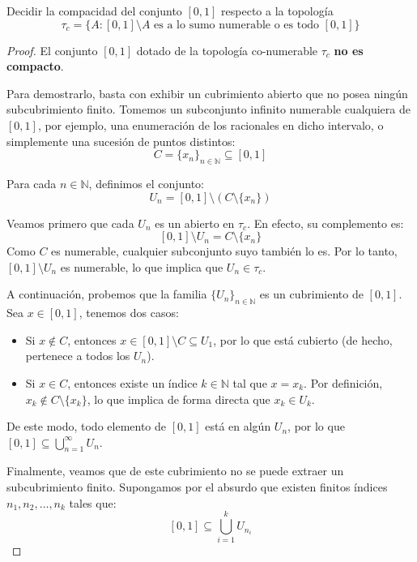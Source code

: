 \documentclass{article}
\theoremstyle{plain}
\theoremstyle{definition}
\newenvironment{ejercicio}[1]{\begin{trivlist}
\item[\hskip \labelsep {\bfseries Ejercicio}\hskip \labelsep {\bfseries #1.}]}{\end{trivlist}}
\begin{document}
\begin{ejercicio}{10}
    Decidir la compacidad del conjunto \( [0, 1] \) respecto a la topología
    \[ \tau_c = \{ A : [0,1] \setminus A \text{ es a lo sumo numerable o es todo } [0, 1] \} \]
\end{ejercicio}
\begin{proof}
    El conjunto \( [0, 1] \) dotado de la topología co-numerable \( \tau_c \) \textbf{no es compacto}.

    Para demostrarlo, basta con exhibir un cubrimiento abierto que no posea ningún subcubrimiento finito. Tomemos un subconjunto infinito numerable cualquiera de \( [0, 1] \), por ejemplo, una enumeración de los racionales en dicho intervalo, o simplemente una sucesión de puntos distintos:\[
        C = \{ x_n \}_{n \in \mathbb{N}} \subseteq [0, 1]
    \]

    Para cada \( n \in \mathbb{N} \), definimos el conjunto:\[
        U_n = [0, 1] \setminus (C \setminus \{ x_n \})
    \]

    Veamos primero que cada \( U_n \) es un abierto en \( \tau_c \). En efecto, su complemento es:\[
        [0, 1] \setminus U_n = C \setminus \{ x_n \}
    \]
    Como \( C \) es numerable, cualquier subconjunto suyo también lo es. Por lo tanto, \( [0, 1] \setminus U_n \) es numerable, lo que implica que \( U_n \in \tau_c \).

    A continuación, probemos que la familia \( {\{ U_n \}}_{n \in \mathbb{N}} \) es un cubrimiento de \( [0, 1] \). Sea \( x \in [0, 1] \), tenemos dos casos:
    \begin{itemize}
        \item Si \( x \notin C \), entonces \( x \in [0, 1] \setminus C \subseteq U_1 \), por lo que está cubierto (de hecho, pertenece a todos los \( U_n \)).
        \item Si \( x \in C \), entonces existe un índice \( k \in \mathbb{N} \) tal que \( x = x_k \). Por definición, \( x_k \notin C \setminus \{ x_k \} \), lo que implica de forma directa que \( x_k \in U_k \).
    \end{itemize}
    De este modo, todo elemento de \( [0, 1] \) está en algún \( U_n \), por lo que \( [0, 1] \subseteq \bigcup_{n=1}^\infty U_n \).

    Finalmente, veamos que de este cubrimiento no se puede extraer un subcubrimiento finito. Supongamos por el absurdo que existen finitos índices \( n_1, n_2, \dots, n_k \) tales que:\[
        [0, 1] \subseteq \bigcup_{i=1}^k U_{n_i}
    \]


\end{proof}
\end{document}
